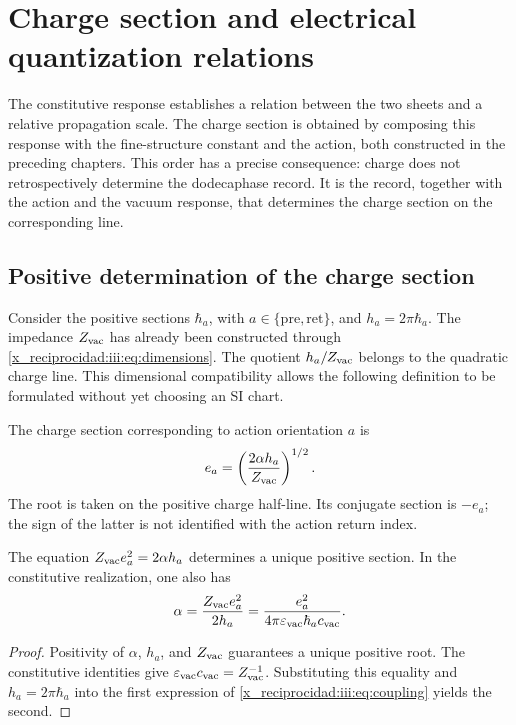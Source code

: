 

\chapter{Charge section and electrical quantization relations}
\label{x_reciprocidad:iii:sec:carga}

The constitutive response establishes a relation between the two sheets and a
relative propagation scale. The charge section is obtained by composing
this response with the fine-structure constant and the action, both
constructed in the preceding chapters. This order has a precise
consequence: charge does not retrospectively determine the dodecaphase record.
It is the record, together with the action and the vacuum response, that
determines the charge section on the corresponding line.

\section{Positive determination of the charge section}

Consider the positive sections $\hbar_a$, with
$a\in\{\mathrm{pre},\mathrm{ret}\}$, and $h_a=2\pi\hbar_a$.
The impedance $Z_{\rm vac}$ has already been constructed through
\eqref{x_reciprocidad:iii:eq:dimensions}. The quotient $h_a/Z_{\rm vac}$ belongs to
the quadratic charge line. This dimensional compatibility allows
the following definition to be formulated without yet choosing an SI chart.

\begin{definition}
The charge section corresponding to action orientation $a$ is
\begin{equation}
 e_a=\left(\frac{2\alpha h_a}{Z_{\rm vac}}\right)^{1/2}.
 \label{x_reciprocidad:iii:eq:charge}
\end{equation}
The root is taken on the positive charge half-line. Its conjugate section
is $-e_a$; the sign of the latter is not identified with the action
return index.
\end{definition}

\begin{proposition}
The equation $Z_{\rm vac}e_a^2=2\alpha h_a$ determines a unique
positive section. In the constitutive realization, one also has
\begin{equation}
 \alpha=\frac{Z_{\rm vac}e_a^2}{2h_a}
 =\frac{e_a^2}{4\pi\varepsilon_{\rm vac}\hbar_a c_{\rm vac}}.
 \label{x_reciprocidad:iii:eq:coupling}
\end{equation}
\end{proposition}
\begin{proof}
Positivity of $\alpha$, $h_a$, and $Z_{\rm vac}$ guarantees a unique
positive root. The constitutive identities give
$\varepsilon_{\rm vac}c_{\rm vac}=Z_{\rm vac}^{-1}$.
Substituting this equality and $h_a=2\pi\hbar_a$ into the first expression
of \eqref{x_reciprocidad:iii:eq:coupling} yields the second.
\end{proof}

